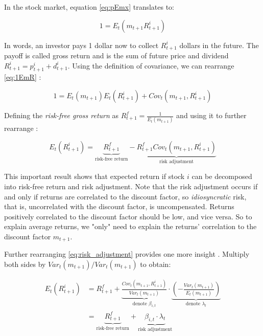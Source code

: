 	 	In the stock market, equation \ref{eq:pEmx} translates to:
	 	
	 	\begin{equation}
	 		1 = E_t(m_{t+1} R_{t+1}^i ) \label{eq:1EmR}
	 	\end{equation} 
	 	
	 	In words, an investor pays 1 dollar now to collect $R_{t+1}^i$ dollars in the future. The payoff is called gross return and is the sum of future price and dividend $R_{t+1}^i = p_{t+1}^i+ d_{t+1}^i$. 
	 	Using the definition of covariance, we can rearrange \ref{eq:1EmR} \citep{cochrane2009asset}:
	 	
	 	\begin{equation}
	 		1 = E_t(m_{t+1}) E_t(R_{t+1}^i) + Cov_t(m_{t+1},R_{t+1}^i) 
	 	\end{equation} 
 	
 		Defining the \textit{risk-free gross return} as $R_{t+1}^f=\frac{1}{E_t(m_{t+1})}$ and using it to further rearrange \citep{cochrane2009asset}:
 		
 		\begin{equation}
 			E_t(R_{t+1}^i) = \underbrace{R_{t+1}^f}_\text{risk-free return}  -  \underbrace{R_{t+1}^f Cov_t(m_{t+1},R_{t+1}^i)}_\text{risk adjustment} \label{eq:risk_adjustment}
 		\end{equation} 
 		
 		This important result shows that expected return if stock $i$ can be decomposed into risk-free return and risk adjustment. Note that the risk adjustment occurs if and only if returns are correlated to the discount factor, so \textit{idiosyncratic} risk, that is, uncorrelated with the discount factor, is uncompensated. Returns positively correlated to the discount factor should be low, and vice versa. So to explain average returns, we "only" need to explain the returns' correlation to the discount factor $m_{t+1}$. 
 		
 		Further rearranging \ref{eq:risk_adjustment} provides one more insight \citep{cochrane2009asset}. Multiply both sides by $Var_t(m_{t+1})/Var_t(m_{t+1})$ to obtain:
 		
 		\begin{align}
	 		E_t(R_{t+1}^i) 
	 		& = {R_{t+1}^f} + 
	 		\underbrace{
	 			\frac{Cov_t(m_{t+1},R_{t+1}^i)}{Var_t(m_{t+1})}
	 			}_\text{denote $\beta_{i,t}$} 
 			\cdot 
 			\underbrace{
 				\left(-\frac{Var_t(m_{t+1})}{E_t(m_{t+1})}\right)
 				}_\text{denote $\lambda_{t}$} \label{eq:factor_model} \\
 			& = \underbrace{{R_{t+1}^f}
 				}_\text{risk-free return} 
 				+ 
 				\underbrace{\beta_{i,t} \cdot \lambda_{t}
 				}_\text{risk adjustment} \label{eq:beta_reprezentation}
 		\end{align} 
 		
